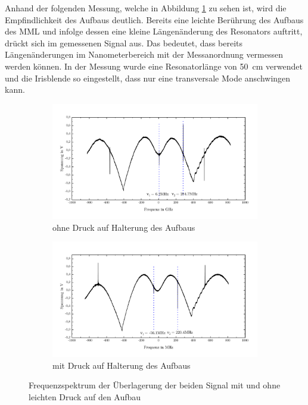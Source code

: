 \documentclass[a4paper,twoside,final]{article}
\begin{document}
%
Anhand der folgenden Messung, welche in Abbildung \ref{fig:berührung} zu sehen ist, wird die Empfindlichkeit des Aufbaus deutlich. Bereits eine leichte Berührung des Aufbaus des MML und infolge dessen eine kleine Längenänderung des Resonators auftritt, drückt sich im gemessenen Signal aus. Das bedeutet, dass bereits Längenänderungen im Nanometerbereich mit der Messanordnung vermessen werden können. In der Messung wurde eine Resonatorlänge von \SI{50}{\centi\meter} verwendet und die Irisblende so eingestellt, dass nur eine transversale Mode anschwingen kann.

\begin{figure}[ht]
  \centering
  \vspace{-5mm}
  \begin{subfigure}{0.8\textwidth}
    \includegraphics[width=\textwidth]{Bilder/ungedrueckt_50cm_1Mode.pdf}
    \caption{ohne Druck auf Halterung des Aufbaus}
  \end{subfigure}
  \begin{subfigure}{0.8\textwidth}
    \includegraphics[width=\textwidth]{Bilder/gedrueckt_50cm_1Mode.pdf}
    \caption{mit Druck auf Halterung des Aufbaus}
  \end{subfigure}
  \caption{Frequenzspektrum der Überlagerung der beiden Signal mit und ohne leichten Druck auf den Aufbau}
  \label{fig:berührung}
\end{figure}
\end{document}
